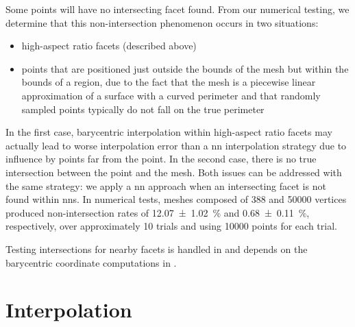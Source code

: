 \documentclass[final,12pt]{elsarticle}
\begin{document}
Some \outpt{} points will have no intersecting facet found.
From our numerical testing, we determine that this non-intersection phenomenon occurs in two situations:
\begin{itemize}%
	\item high-aspect ratio facets (described above)
	\item \outpt{} points that are positioned just outside the bounds of the mesh but within the bounds of a region, due to the fact that the mesh is a piecewise linear approximation of a surface with a curved perimeter and that randomly sampled points typically do not fall on the true perimeter
\end{itemize}
In the first case, barycentric interpolation within high-aspect ratio facets may actually lead to worse interpolation error than a \gls{nn} interpolation strategy due to influence by points far from the \outpt{} point. In the second case, there is no true intersection between the \outpt{} point and the mesh. Both issues can be addressed with the same strategy: we apply a \gls{nn} approach when an intersecting facet is not found within  \glspl{nn}. In numerical tests, meshes composed of \num{388} and \num{50000} vertices produced non-intersection rates of \SI{12.07 \pm 1.02}{\percent} and \SI{0.68 \pm 0.11}{\percent}, respectively, over approximately \num{10} trials and using \num{10000} \outpt{} points for each trial.

Testing intersections for nearby facets is handled in  and depends on the barycentric coordinate computations in .


\section{Interpolation}
\label{sec:app:bary-interp}
\end{document}
